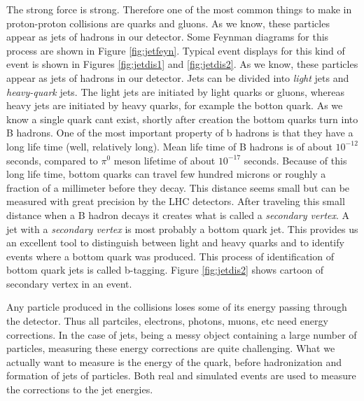 The strong force is strong.  Therefore one of the most common things to make in proton-proton collisions are quarks and gluons.  As we know, these particles appear as jets of hadrons in our detector.  Some Feynman diagrams for this process are shown in Figure \ref{fig:jetfeyn}.  Typical event displays for this kind of event is shown in Figures \ref{fig:jetdis1} and \ref{fig:jetdis2}.  As we know, these particles appear as jets of hadrons in our detector.  Jets can be divided  into   {\it light} jets   and  {\it heavy-quark}  jets.  The light jets are initiated by light quarks or gluons, whereas heavy jets are initiated by heavy quarks, for example the botton quark.    As we know a single quark cant exist, shortly after creation the bottom quarks turn into B hadrons. One of the most important property of b hadrons is that they have a long life time (well, relatively long).  Mean life time of B hadrons is of about  $10^{-12}$ seconds, compared to $\pi^0$ meson lifetime of about $10^{-17}$ seconds. Because of this long life time, bottom quarks   can travel  few hundred microns or roughly a fraction of a millimeter before they decay. This distance seems small but can be measured with great precision by the LHC detectors. After traveling this small distance when a B hadron decays it creates what is called   a {\it secondary vertex}.  A jet with a {\it secondary vertex} is most probably a  bottom quark jet. This provides us an excellent tool to distinguish between light and heavy quarks and to identify events where a bottom quark was produced. This process of identification of bottom quark jets is called {b-tagging}. Figure \ref{fig:jetdis2}  shows cartoon of  secondary vertex in an event.
 

Any particle produced in the collisions loses some of its energy passing through the detector. Thus all partciles, electrons, photons, muons, etc need energy corrections. In the case of jets, being a messy object containing a large number of particles, measuring these energy corrections are quite challenging.  What we actually want to measure is the energy of the quark, before hadronization and formation of jets of particles.  Both real and simulated events are used to measure the corrections to the jet energies.



